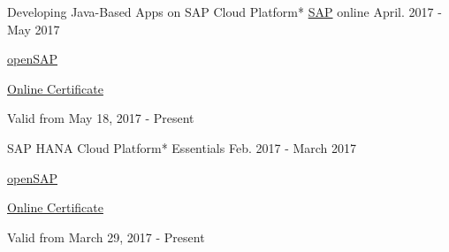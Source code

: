 

\begin{cventries}

  \cventry
    {Developing Java-Based Apps on SAP Cloud Platform*} %
    {\href{https://www.sap.com/index.html}{SAP}} %
    {online} %
    {April. 2017 - May 2017} %
    {
	    \begin{cvitems} %
        \item {\href{https://open.sap.com/}{openSAP}} %
        \item {\href{https://open.sap.com/verify/xuhes-rimus-bikon-roper-hicom}{Online Certificate}} %
        \item {Valid from May 18, 2017 - Present} %
      \end{cvitems}
    }    

  \cventry
    {SAP HANA Cloud Platform* Essentials} %
    {} %
    {} %
    {Feb. 2017 - March 2017} %
    {
	    \begin{cvitems} %
        \item {\href{https://open.sap.com/}{openSAP}} %
        \item {\href{https://open.sap.com/verify/xulor-nynoz-soped-muvuv-zitek}{Online Certificate}} %
        \item {Valid from March 29, 2017 - Present} %
      \end{cvitems}
    }        
    

\end{cventries}
